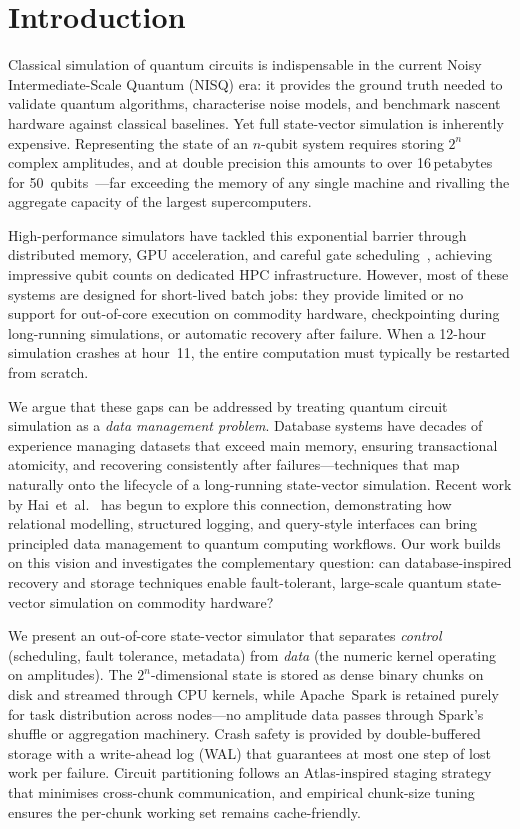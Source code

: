 \section{Introduction}
\label{sec:introduction}

Classical simulation of quantum circuits is indispensable in the
current Noisy Intermediate-Scale Quantum (NISQ) era: it provides
the ground truth needed to validate quantum algorithms, characterise
noise models, and benchmark nascent hardware against classical
baselines. Yet full state-vector simulation is inherently expensive.
Representing the state of an $n$-qubit system requires storing
$2^n$ complex amplitudes, and at double precision this amounts to
over 16\,petabytes for 50~qubits~\cite{wang2021quantum}---far
exceeding the memory of any single machine and rivalling the
aggregate capacity of the largest supercomputers.

High-performance simulators have tackled this exponential barrier
through distributed memory, GPU acceleration, and careful gate
scheduling~\cite{wang2021quantum}, achieving impressive qubit counts
on dedicated HPC infrastructure. However, most of these systems
are designed for short-lived batch jobs: they provide limited or no
support for out-of-core execution on commodity hardware,
checkpointing during long-running simulations, or automatic
recovery after failure. When a 12-hour simulation crashes at
hour~11, the entire computation must typically be restarted from
scratch.

We argue that these gaps can be addressed by treating quantum
circuit simulation as a \emph{data management problem}. Database
systems have decades of experience managing datasets that exceed
main memory, ensuring transactional atomicity, and recovering
consistently after failures---techniques that map naturally onto the
lifecycle of a long-running state-vector simulation. Recent work by
Hai~et~al.~\cite{hai2025cqms} has begun to explore this connection,
demonstrating how relational modelling, structured logging, and
query-style interfaces can bring principled data management to
quantum computing workflows. Our work builds on this vision and
investigates the complementary question: can database-inspired
recovery and storage techniques enable fault-tolerant, large-scale
quantum state-vector simulation on commodity hardware?

We present an out-of-core state-vector simulator that separates
\emph{control} (scheduling, fault tolerance, metadata) from
\emph{data} (the numeric kernel operating on amplitudes). The
$2^n$-dimensional state is stored as dense binary chunks on disk and
streamed through CPU kernels, while Apache~Spark is retained purely
for task distribution across nodes---no amplitude data passes through
Spark's shuffle or aggregation machinery. Crash safety is provided
by double-buffered storage with a write-ahead log (WAL) that
guarantees at most one step of lost work per failure. Circuit
partitioning follows an Atlas-inspired staging
strategy~\cite{atlas} that minimises cross-chunk communication, and
empirical chunk-size tuning ensures the per-chunk working set remains
cache-friendly.

